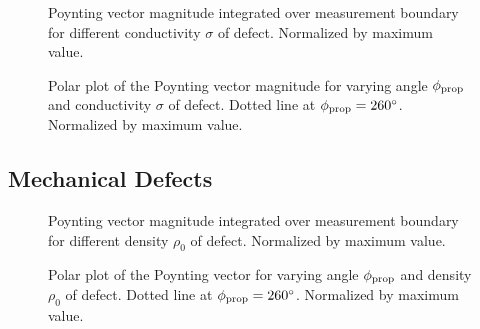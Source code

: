 \documentclass[11pt,twoside]{eitExjobb}
\begin{document}
	
	\begin{figure}[h]
		\centering
		\resizebox{\textwidth}{!}{
			
		}
		\caption{\label{fig:res-cond-power} Poynting vector magnitude integrated over measurement boundary for different conductivity $\sigma$ of defect. Normalized by maximum value.}
	\end{figure}
	
	\begin{figure}[h]
		\centering
		\resizebox{\textwidth}{!}{
			
		}
		\caption{\label{fig:res-cond-polar} Polar plot of the Poynting vector magnitude for varying angle $\phi_{\mathrm{prop}}$ and conductivity $\sigma$ of defect. Dotted line at $\phi_{\mathrm{prop}} = 260^\circ$. Normalized by maximum value.}
	\end{figure}
	
	\subsection{Mechanical Defects}
	
	\begin{figure}[h]
		\centering
		\resizebox{\textwidth}{!}{
			
		}
		\caption{\label{fig:res-mech-power} Poynting vector magnitude integrated over measurement boundary for different density $\rho_0$ of defect. Normalized by maximum value.}
	\end{figure}
	
	\begin{figure}[h]
		\centering
		\resizebox{\textwidth}{!}{
			
		}
		\caption{\label{fig:res-mech-polar} Polar plot of the Poynting vector for varying angle $\phi_{\mathrm{prop}}$ and density $\rho_0$ of defect. Dotted line at $\phi_{\mathrm{prop}} = 260^\circ$. Normalized by maximum value.}
	\end{figure}
	
\end{document}
